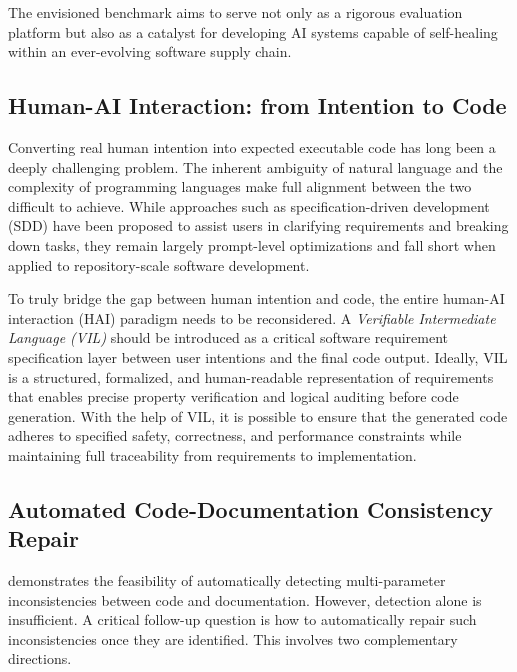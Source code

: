 The envisioned benchmark aims to serve not only as a rigorous evaluation platform but also as a catalyst for developing AI systems capable of self-healing within an ever-evolving software supply chain.


\subsection{Human-AI Interaction: from Intention to Code}
Converting real human intention into expected executable code has long been a deeply challenging problem. The inherent ambiguity of natural language and the complexity of programming languages make full alignment between the two difficult to achieve. While approaches such as specification-driven development (SDD) have been proposed to assist users in clarifying requirements and breaking down tasks, they remain largely prompt-level optimizations and fall short when applied to repository-scale software development.

To truly bridge the gap between human intention and code, the entire human-AI interaction (HAI) paradigm needs to be reconsidered. A \textit{Verifiable Intermediate Language (VIL)} should be introduced as a critical software requirement specification layer between user intentions and the final code output. Ideally, VIL is a structured, formalized, and human-readable representation of requirements that enables precise property verification and logical auditing before code generation. With the help of VIL, it is possible to ensure that the generated code adheres to specified safety, correctness, and performance constraints while maintaining full traceability from requirements to implementation.

\subsection{Automated Code-Documentation Consistency Repair}
\toolchecker demonstrates the feasibility of automatically detecting multi-parameter inconsistencies between code and documentation. However, detection alone is insufficient. A critical follow-up question is how to automatically repair such inconsistencies once they are identified. This involves two complementary directions.

